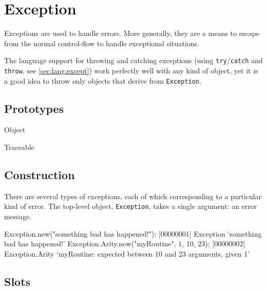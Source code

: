 
\section{Exception}

Exceptions are used to handle errors.  More generally, they are a
means to escape from the normal control-flow to handle exceptional
situations.

The language support for throwing and catching exceptions (using
\lstinline|try|/\lstinline|catch| and \lstinline|throw|, see
\autoref{sec:lang:except}) work perfectly well with any kind of
object, yet it is a good idea to throw only objects that derive from
\lstinline|Exception|.

\subsection{Prototypes}

\begin{refObjects}
\item[Object]
\item[Traceable]
\end{refObjects}

\subsection{Construction}

There are several types of exceptions, each of which corresponding to
a particular kind of error.  The top-level object,
\lstinline|Exception|, takes a single argument: an error message.

\begin{urbiscript}[firstnumber=1]
Exception.new("something bad has happened!");
[00000001] Exception `something bad has happened!'
Exception.Arity.new("myRoutine", 1, 10, 23);
[00000002] Exception.Arity `myRoutine: expected between 10 and 23 arguments, given 1'
\end{urbiscript}


\subsection{Slots}

